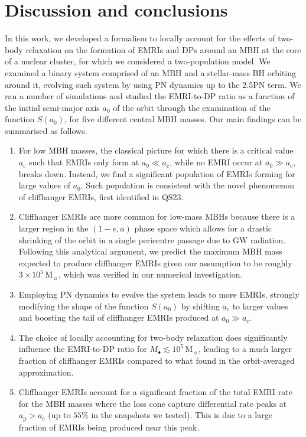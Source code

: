 \documentclass[desactivate]{aa}
\begin{document}

\section{Discussion and conclusions} \label{sec:disc_conc}

    In this work, we developed a formalism to locally account for the effects of two-body relaxation on the formation of EMRIs and DPs around an MBH at the core of a nuclear cluster, for which we considered a two-population model. We examined a binary system comprised of an MBH and a stellar-mass BH orbiting around it, evolving such system by using PN dynamics up to the 2.5PN term. We ran a number of simulations and studied the EMRI-to-DP ratio as a function of the initial semi-major axis $a_0$ of the orbit through the examination of the function $S(a_0)$, for five different central MBH masses. Our main findings can be summarised as follows.
    \begin{enumerate}
        \item For low MBH masses, the classical picture for which there is a critical value $a_\mathrm{c}$ such that EMRIs only form at $a_0 \ll a_\mathrm{c}$, while no EMRI occur at $a_0 \gg a_\mathrm{c}$, breaks down. Instead, we find a significant population of EMRIs forming for large values of $a_0$. Such population is consistent with the novel phenomenon of cliffhanger EMRIs, first identified in QS23.
        \item Cliffhanger EMRIs are more common for low-mass MBHs because there is a larger region in the $(1-e,a)$ phase space which allows for a drastic shrinking of the orbit in a single pericentre passage due to GW radiation. Following this analytical argument, we predict the maximum MBH mass expected to produce cliffhanger EMRIs given our assumption to be roughly $3 \times 10^5 \, \mathrm{M_\sun}$, which was verified in our numerical investigation.
        \item Employing PN dynamics to evolve the system leads to more EMRIs, strongly modifying the shape of the function $S(a_0)$ by shifting $a_\mathrm{c}$ to larger values and boosting the tail of cliffhanger EMRIs produced at $a_0 \gg a_\mathrm{c}$.
        \item The choice of locally accounting for two-body relaxation does significantly influence the EMRI-to-DP ratio for $M_\bullet \lesssim 10^5 \, \mathrm{M_\sun}$, leading to a much larger fraction of cliffhanger EMRIs compared to what found in the orbit-averaged approximation.
        \item Cliffhanger EMRIs account for a significant fraction of the total EMRI rate for the MBH masses where the loss cone capture differential rate peaks at $a_\mathrm{p} > a_\mathrm{c}$ (up to $55\%$ in the snapshots we tested). This is due to a large fraction of EMRIs being produced near this peak.
    \end{enumerate}
\end{document}
